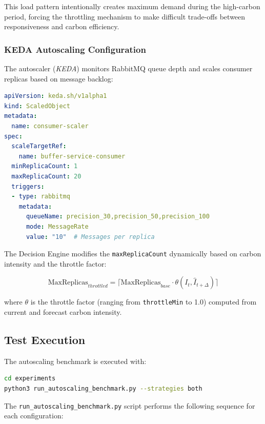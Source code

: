 This load pattern intentionally creates maximum demand during the high-carbon period, forcing the throttling mechanism to make difficult trade-offs between responsiveness and carbon efficiency.

\subsubsection{KEDA Autoscaling Configuration}

The autoscaler (\textit{KEDA}) monitors RabbitMQ queue depth and scales consumer replicas based on message backlog:

\begin{lstlisting}[language=yaml,caption={KEDA ScaledObject configuration for carbon-aware throttling.},label=lst:keda-throttle]
apiVersion: keda.sh/v1alpha1
kind: ScaledObject
metadata:
  name: consumer-scaler
spec:
  scaleTargetRef:
    name: buffer-service-consumer
  minReplicaCount: 1
  maxReplicaCount: 20
  triggers:
  - type: rabbitmq
    metadata:
      queueName: precision_30,precision_50,precision_100
      mode: MessageRate
      value: "10"  # Messages per replica
\end{lstlisting}

The Decision Engine modifies the \texttt{maxReplicaCount} dynamically based on carbon intensity and the throttle factor:

\begin{equation}
    \text{MaxReplicas}_{throttled} = \lceil \text{MaxReplicas}_{base} \cdot \theta(I_t, \hat{I}_{t+\Delta}) \rceil
\end{equation}

where $\theta$ is the throttle factor (ranging from \texttt{throttleMin} to 1.0) computed from current and forecast carbon intensity.

\subsection{Test Execution}

The autoscaling benchmark is executed with:

\begin{lstlisting}[language=bash,caption={Execution of autoscaling comparison test.},label=lst:run-autoscaling]
cd experiments
python3 run_autoscaling_benchmark.py --strategies both
\end{lstlisting}

The \texttt{run\_autoscaling\_benchmark.py} script performs the following sequence for each configuration:

